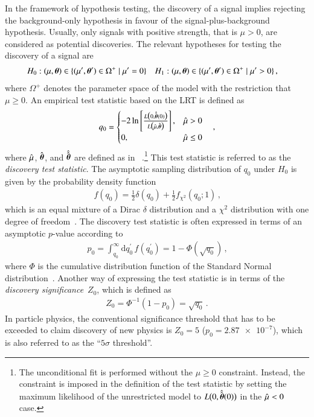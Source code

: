In the framework of hypothesis testing, the discovery of a signal implies
rejecting the background-only hypothesis in favour of the signal-plus-background
hypothesis. Usually, only signals with positive strength, that is $\mu > 0$, are
considered as potential discoveries. The relevant hypotheses for testing the
discovery of a signal are
\begin{align*}
  &H_0: (\mu, \myvec{\theta}) \in \{ (\mu^\prime, \myvec{\theta}^\prime) \in \Omega^+ \mid \mu^\prime = 0 \}
  &&H_1: (\mu, \myvec{\theta}) \in \{ (\mu^\prime, \myvec{\theta}^\prime) \in \Omega^+ \mid \mu^\prime > 0 \} \,\text{,}
\end{align*}
where $\Omega^+$ denotes the parameter space of the model with the restriction
that $\mu \geq 0$. An empirical test statistic based on the LRT is defined as
\begin{align*}
  q_0 = \begin{cases}
          -2 \ln \left[ \frac{ L\bigl(0, \hat{\hat{\myvec{\theta}}}(0) \bigr)}{L\bigl( \muhat, \hat{\myvec{\theta}} \bigr)} \right], & \muhat > 0 \\
          0,          & \muhat \leq 0
        \end{cases} \quad\text{,}
\end{align*}
where $\hat{\mu}$, $\hat{\myvec{\theta}}$, and $\hat{\hat{\myvec{\theta}}}$ are
defined as in
~\cite{Cowan:2010js}.\footnote{The
  unconditional fit is performed without the $\mu \geq 0$ constraint. Instead,
  the constraint is imposed in the definition of the test statistic by setting
  the maximum likelihood of the unrestricted model to
  $L\bigl( 0, \hat{\hat{\myvec{\theta}}}(0) \bigr)$ in the $\hat{\mu} < 0$ case.}
This test statistic is referred to as the \emph{discovery test statistic}. The
asymptotic sampling distribution of $q_0$ under $H_0$ is given by the
probability density function
\begin{align*}
  f(q_0) = \frac{1}{2} \delta(q_0) + \frac{1}{2} f_{\chi^2}(q_0; 1) \,\text{,}
\end{align*}
which is an equal mixture of a Dirac $\delta$ distribution and a $\chi^2$
distribution with one degree of freedom~\cite{Cowan:2010js}. The discovery test
statistic is often expressed in terms of an asymptotic $p$-value according
to
\begin{align*}
  p_0 = \int_{q_{0}}^\infty \mathrm{d}q_0^\prime \, f(q_0^\prime) =
  1 - \Phi\left(\sqrt{q_{0}}\right) \,\text{,}
\end{align*}
where $\Phi$ is the cumulative distribution function of the Standard Normal
distribution~\cite{Cowan:2010js}. Another way of expressing the test statistic
is in terms of the \emph{discovery significance}~$Z_0$, which is defined
as~\cite{Cowan:2010js}
\begin{align*}
  Z_0 = \Phi^{-1}(1 - p_0) = \sqrt{q_{0}} \,\text{.}
\end{align*}
In particle physics, the conventional significance threshold that has to be
exceeded to claim discovery of new physics is $Z_0 = 5$ ($p_0 = \num{2.87e-7}$),
which is also referred to as the ``$5\sigma$ threshold''.


